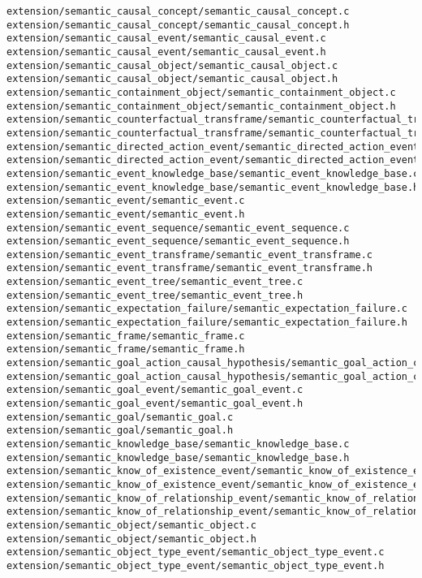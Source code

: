 \begin{lstlisting}
extension/semantic_causal_concept/semantic_causal_concept.c
extension/semantic_causal_concept/semantic_causal_concept.h
extension/semantic_causal_event/semantic_causal_event.c
extension/semantic_causal_event/semantic_causal_event.h
extension/semantic_causal_object/semantic_causal_object.c
extension/semantic_causal_object/semantic_causal_object.h
extension/semantic_containment_object/semantic_containment_object.c
extension/semantic_containment_object/semantic_containment_object.h
extension/semantic_counterfactual_transframe/semantic_counterfactual_transframe.c
extension/semantic_counterfactual_transframe/semantic_counterfactual_transframe.h
extension/semantic_directed_action_event/semantic_directed_action_event.c
extension/semantic_directed_action_event/semantic_directed_action_event.h
extension/semantic_event_knowledge_base/semantic_event_knowledge_base.c
extension/semantic_event_knowledge_base/semantic_event_knowledge_base.h
extension/semantic_event/semantic_event.c
extension/semantic_event/semantic_event.h
extension/semantic_event_sequence/semantic_event_sequence.c
extension/semantic_event_sequence/semantic_event_sequence.h
extension/semantic_event_transframe/semantic_event_transframe.c
extension/semantic_event_transframe/semantic_event_transframe.h
extension/semantic_event_tree/semantic_event_tree.c
extension/semantic_event_tree/semantic_event_tree.h
extension/semantic_expectation_failure/semantic_expectation_failure.c
extension/semantic_expectation_failure/semantic_expectation_failure.h
extension/semantic_frame/semantic_frame.c
extension/semantic_frame/semantic_frame.h
extension/semantic_goal_action_causal_hypothesis/semantic_goal_action_causal_hypothesis.c
extension/semantic_goal_action_causal_hypothesis/semantic_goal_action_causal_hypothesis.h
extension/semantic_goal_event/semantic_goal_event.c
extension/semantic_goal_event/semantic_goal_event.h
extension/semantic_goal/semantic_goal.c
extension/semantic_goal/semantic_goal.h
extension/semantic_knowledge_base/semantic_knowledge_base.c
extension/semantic_knowledge_base/semantic_knowledge_base.h
extension/semantic_know_of_existence_event/semantic_know_of_existence_event.c
extension/semantic_know_of_existence_event/semantic_know_of_existence_event.h
extension/semantic_know_of_relationship_event/semantic_know_of_relationship_event.c
extension/semantic_know_of_relationship_event/semantic_know_of_relationship_event.h
extension/semantic_object/semantic_object.c
extension/semantic_object/semantic_object.h
extension/semantic_object_type_event/semantic_object_type_event.c
extension/semantic_object_type_event/semantic_object_type_event.h

\end{lstlisting}
